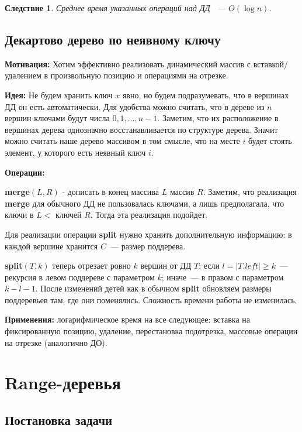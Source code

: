 \documentclass[12pt, a4paper]{article}
\theoremstyle{definition}
\theoremstyle{plain}
\newtheorem*{corollary}{Следствие}
\theoremstyle{remark}
\begin{document}
\begin{corollary}
Среднее время указанных операций над ДД ~--- $O(\log n)$.
\end{corollary}

\subsection{Декартово дерево по неявному ключу}

\textbf{Мотивация:} Хотим эффективно реализовать динамический массив с вставкой/удалением в произвольную позицию и операциями на отрезке.

\textbf{Идея:} Не будем хранить ключ $x$ явно, но будем подразумевать, что в вершинах ДД он есть автоматически. Для удобства можно считать, что в дереве из $n$ вершин ключами будут числа $0, 1, ..., n - 1$. Заметим, что их расположение в вершинах дерева однозначно восстанавливается по структуре дерева. Значит можно считать наше дерево массивом в том смысле, что на месте $i$ будет стоять элемент, у которого есть неявный ключ $i$.

\textbf{Операции:}

\noindent\textbf{merge}$(L, R)$ - дописать в конец массива $L$ массив $R$. Заметим, что реализация \textbf{merge} для обычного ДД не пользовалась ключами, а лишь предполагала, что ключи в $L <$ ключей $R$. Тогда эта реализация подойдет. 

Для реализации операции \textbf{split} нужно хранить дополнительную информацию: в каждой вершине хранится $C$~--- размер поддерева. 

\noindent\textbf{split}$(T, k)$ теперь отрезает ровно $k$ вершин от ДД $T$: если $l = |T.\mathit{left}| \geq k$~--- рекурсия в левом поддереве с параметром $k$;
иначе~--- в правом с параметром $k - l - 1$. После изменений детей как в обычном \textbf{split} обновляем размеры поддеревьев там, где они поменялись. Сложность времени работы не изменилась.

\textbf{Применения:} логарифмическое время на все следующее: вставка на фиксированную позицию, удаление, перестановка подотрезка, массовые операции на отрезке (аналогично ДО).

\section{Range-деревья}

\subsection{Постановка задачи}
\end{document}
